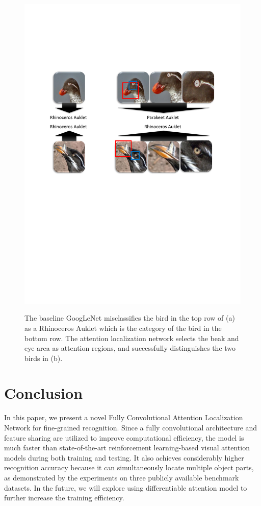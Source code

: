 \documentclass[runningheads]{llncs}
\begin{document}
\begin{figure}[!t]
\begin{center}
{    \includegraphics[scale = 0.25]{4-2.pdf}}
\end{center}
\caption{The baseline GoogLeNet misclassifies the bird in the top row of (a) as a Rhinoceros Auklet which is the category of the bird in the bottom row. The attention localization network selects the beak and eye area as attention regions, and successfully distinguishes the two birds in (b).
\vspace{-8pt}
}\label{fig:attention_illustration2}
\end{figure}

\section{Conclusion}
In this paper, we present a novel Fully Convolutional Attention Localization Network for fine-grained recognition.
Since a fully convolutional architecture and feature sharing are utilized to improve computational efficiency,
the model is much faster than state-of-the-art reinforcement learning-based visual attention models during both training and testing.
It also achieves considerably higher recognition accuracy because it can simultaneously locate multiple object parts,
as demonstrated by the experiments on three publicly available benchmark datasets.
In the future, we will explore using differentiable attention model to further increase the training efficiency.




\end{document}
